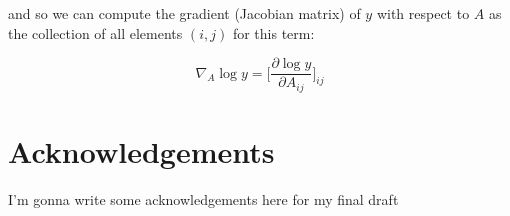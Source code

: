 \documentclass{article}
\theoremstyle{definition}
\begin{document}
and so we can compute the gradient (Jacobian matrix) of $y$ with respect to $A$ as the collection of all elements $(i,j)$ for this term:

\begin{equation}
    \nabla_A \log y = \bigg[\frac{\partial \log y}{\partial A_{ij}} \bigg]_{ij}
\end{equation}

\newpage
\section{Acknowledgements}

I'm gonna write some acknowledgements here for my final draft

\newpage 

\printbibliography
\end{document}
